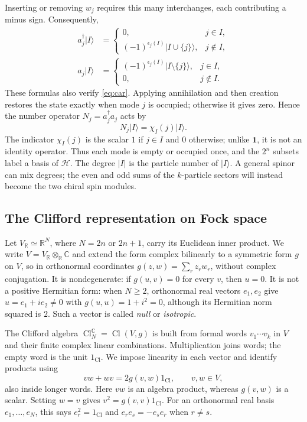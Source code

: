 \documentclass{article}
\theoremstyle{definition}
\theoremstyle{remark}
\newcommand{\C}{\mathbb C}
\newcommand{\Cl}{\operatorname{Cl}}
\newcommand{\ket}[1]{\lvert #1\rangle}
\begin{document}
Inserting or removing $w_j$ requires this many interchanges, each
contributing a minus sign. Consequently,
\begin{align}
 a_j^\dagger\ket I
 &=
 \begin{cases}
  0,&j\in I,\\
  (-1)^{\epsilon_j(I)}\ket{I\cup\{j\}},&j\notin I,
 \end{cases}
 \label{eq:creation-on-fock-basis}\\
 a_j\ket I
 &=
 \begin{cases}
  (-1)^{\epsilon_j(I)}\ket{I\setminus\{j\}},&j\in I,\\
  0,&j\notin I.
 \end{cases}
 \label{eq:annihilation-on-fock-basis}
\end{align}
These formulas also verify \eqref{eq:car}. Applying annihilation and then
creation restores the state exactly when mode $j$ is occupied; otherwise
it gives zero. Hence the number operator $N_j=a_j^\dagger a_j$ acts by
\begin{equation}
 N_j\ket I=\chi_I(j)\ket I.
 \label{eq:number-operator-action}
\end{equation}
The indicator $\chi_I(j)$ is the scalar $1$ if $j\in I$ and $0$
otherwise; unlike $\mathbf1$, it is not an identity operator. Thus each
mode is empty or occupied once, and the $2^n$ subsets label a basis of
$\mathcal H$. The degree $|I|$ is the particle number of $\ket I$.
A general spinor can mix degrees; the even and odd sums of the
$k$-particle sectors will instead become the two chiral spin modules.

\subsection{The Clifford representation on Fock space}
\label{sec:clifford-fock-representation}

Let $V_{\mathbb R}\simeq\mathbb R^N$, where $N=2n$ or $2n+1$, carry
its Euclidean inner product.  We write
$V=V_{\mathbb R}\otimes_{\mathbb R}\C$ and extend the form complex
bilinearly to a symmetric form $g$ on $V$, so in orthonormal coordinates
$g(z,w)=\sum_r z_rw_r$, without complex conjugation. It is nondegenerate:
if $g(u,v)=0$ for every $v$, then $u=0$. It is not a positive Hermitian form:
when $N\ge2$,
orthonormal real vectors $e_1,e_2$ give $u=e_1+ie_2\ne0$ with
$g(u,u)=1+i^2=0$, although its Hermitian norm squared is $2$. Such a vector is called \emph{null} or
\emph{isotropic}.

The Clifford algebra $\Cl_N^\C=\Cl(V,g)$ is built from formal words
$v_1\cdots v_k$ in $V$ and their finite complex linear combinations.
Multiplication joins words; the empty word is the unit $1_{\Cl}$.
We impose linearity in each vector and
identify products using
\begin{equation}
 vw+wv=2g(v,w)1_{\Cl},\qquad v,w\in V,
 \label{eq:clifford-relation}
\end{equation}
also inside longer words. Here $vw$ is an algebra product, whereas $g(v,w)$
is a scalar. Setting $w=v$ gives $v^2=g(v,v)1_{\Cl}$. For an orthonormal
real basis $e_1,\ldots,e_N$, this says $e_r^2=1_{\Cl}$ and
$e_re_s=-e_se_r$ when $r\ne s$.
\end{document}
